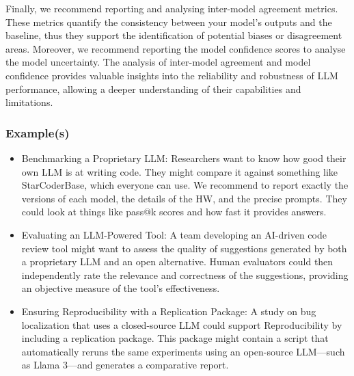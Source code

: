Finally, we recommend reporting and analysing inter-model agreement metrics. These metrics quantify the consistency between your model's outputs 
and the baseline, thus they support the identification of potential biases or disagreement areas.  Moreover, we recommend reporting the model 
confidence scores to analyse the model uncertainty.  The analysis of inter-model agreement and model confidence provides valuable insights into 
the reliability and robustness of LLM performance, allowing a deeper understanding of their capabilities and limitations.


\subsubsection{Example(s)}
\begin{itemize}
    \item Benchmarking a Proprietary LLM: Researchers want to know how good their own LLM is at writing code. They might compare it against something like StarCoderBase, which everyone can use. We recommend to report exactly the versions of each model, the details of the HW, and the precise prompts. They could look at things like pass@k scores and how fast it provides answers. 
    \item Evaluating an LLM-Powered Tool: A team developing an AI-driven code review tool might want to assess the quality of suggestions generated by both a proprietary LLM and an open alternative. Human evaluators could then independently rate the relevance and correctness of the suggestions, providing an objective measure of the tool's effectiveness.
    \item Ensuring Reproducibility with a Replication Package: A study on bug localization that uses a closed-source LLM could support Reproducibility by including a replication package. This package might contain a script that automatically reruns the same experiments using an open-source LLM—such as Llama 3—and generates a comparative report.
\end{itemize}

